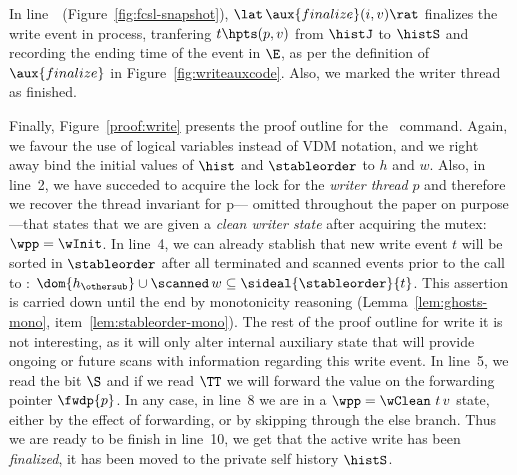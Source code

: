 
In line~\lineWrtFnz~(Figure~\ref{fig:fcsl-snapshot}), $
\lat\,\aux{finalize}(i,v)\rat $ finalizes the write event in process,
tranfering $t \hpts (p,v)$ from $\histJ$ to $\histS$ and recording the
ending time of the event in $\E$, as per the definition of
$\aux{finalize}$ in Figure~\ref{fig:writeauxcode}. Also, we marked the
writer thread as finished.
%

Finally, Figure~\ref{proof:write} presents the proof outline for the
\jywrite\ command. Again, we favour the use of logical variables
instead of VDM notation, and we right away bind the initial values of
$\hist$ and $\stableorder$ to $h$ and $w$. Also, in line~2, we have
succeded to acquire the lock for the {\it writer thread} $p$ and
therefore we recover the thread invariant for p--- omitted throughout
the paper on purpose---that states that we are given a {\it clean
  writer state } after acquiring the mutex: $\wpp =\wInit$. In line~4,
we can already stablish that new write event $t$ will be sorted in
$\stableorder$ after all terminated and scanned events prior to the
call to \jywrite: $\dom{h_{\othersub}} \cup \scanned\, w \subseteq
\sideal{\stableorder}{t}$. This assertion is carried down until the
end by monotonicity reasoning (Lemma~\ref{lem:ghosts-mono},
item~\ref{lem:stableorder-mono}). The rest of the proof outline for
write it is not interesting, as it will only alter internal auxiliary
state that will provide ongoing or future scans with information
regarding this write event. In line~5, we read the bit $\S$ and if we
read $\TT$ we will forward the value on the forwarding pointer
$\fwdp{p}$. In any case, in line~8 we are in a $\wpp = \wClean\ t\, v$
state, either by the effect of forwarding, or by skipping through the
else branch. Thus we are ready to be finish in line~10, we get that
the active write has been {\it finalized}, \ie it has been moved to
the private self history $\histS$.


